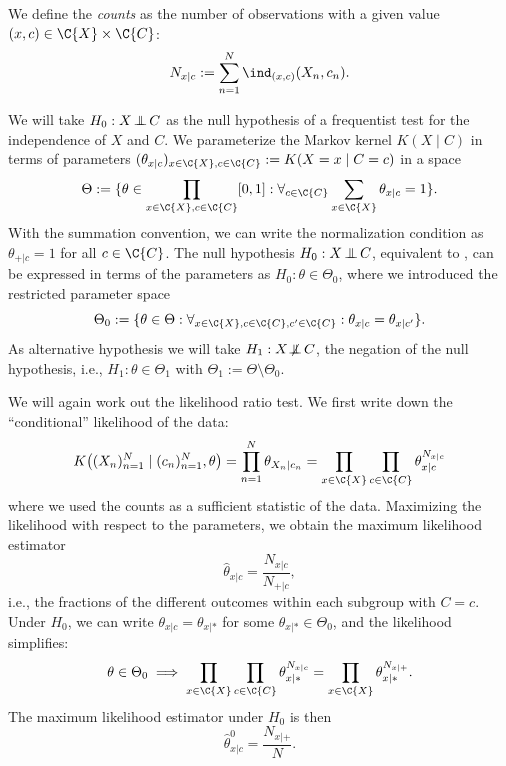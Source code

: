 We define the \emph{counts} as the number of observations with a given value $(x,c)\in\C{X}\times\C{C}$:
$$N_{x|c} := \sum_{n=1}^N \ind_{(x,c)}(X_n,c_n).$$

We will take $H_0 : X \operatorname*{\perp\mkern-11mu\perp} C$ as the null hypothesis of a frequentist test for the independence of $X$ and $C$.
We parameterize the Markov kernel $K(X \mid C)$ in terms of parameters
$(\theta_{x|c})_{x\in\C{X},c\in\C{C}} := K(X = x \mid C = c)$ in a space
$$\Theta := %
\{ \theta \in \prod_{x\in\C{X},c\in\C{C}} [0,1] : \forall_{c\in\C{C}} \sum_{x\in\C{X}} \theta_{x|c} = 1\}.$$
With the summation convention, we can write the normalization condition as $\theta_{+|c} = 1$ for all $c \in \C{C}$.
The null hypothesis $H_0 : X \operatorname*{\perp\mkern-11mu\perp} C$, equivalent to , can be expressed
in terms of the parameters as $H_0 : \theta \in \Theta_0$, where we introduced the restricted parameter space
$$\Theta_0 := \{ \theta \in \Theta : \forall_{x\in\C{X},c\in\C{C},c'\in\C{C}}: \theta_{x|c} = \theta_{x|c'} \}.$$
As alternative hypothesis we will take $H_1 : X \operatorname*{\not\mkern-2mu\perp\mkern-11mu\perp} C$, the negation of the null hypothesis, i.e.,
$H_1 : \theta \in \Theta_1$ with $\Theta_1 := \Theta \setminus \Theta_0$.

We will again work out the likelihood ratio test. 
We first write down the ``conditional'' likelihood of the data:
$$K\big((X_n)_{n=1}^N \mid (c_n)_{n=1}^N, \theta\big)
= \prod_{n=1}^N \theta_{X_n|c_n} 
= \prod_{x\in\C{X}} \prod_{c\in\C{C}} \theta_{x|c}^{N_{x|c}}$$
where we used the counts as a sufficient statistic of the data.
Maximizing the likelihood with respect to the parameters, we obtain the maximum likelihood estimator
$$\hat \theta_{x|c} = \frac{N_{x|c}}{N_{+|c}},$$
i.e., the fractions of the different outcomes within each subgroup with $C = c$.
Under $H_0$, we can write $\theta_{x|c} = \theta_{x|\ast}$ for some $\theta_{x|\ast} \in \Theta_0$, 
and the likelihood simplifies:
$$\theta \in \Theta_0 \implies \prod_{x\in\C{X}} \prod_{c\in\C{C}} \theta_{x|\ast}^{N_{x|c}} = 
\prod_{x\in\C{X}} \theta_{x|\ast}^{N_{x|+}}.$$
The maximum likelihood estimator under $H_0$ is then
$$\hat \theta^0_{x|c} = \frac{N_{x|+}}{N}.$$

